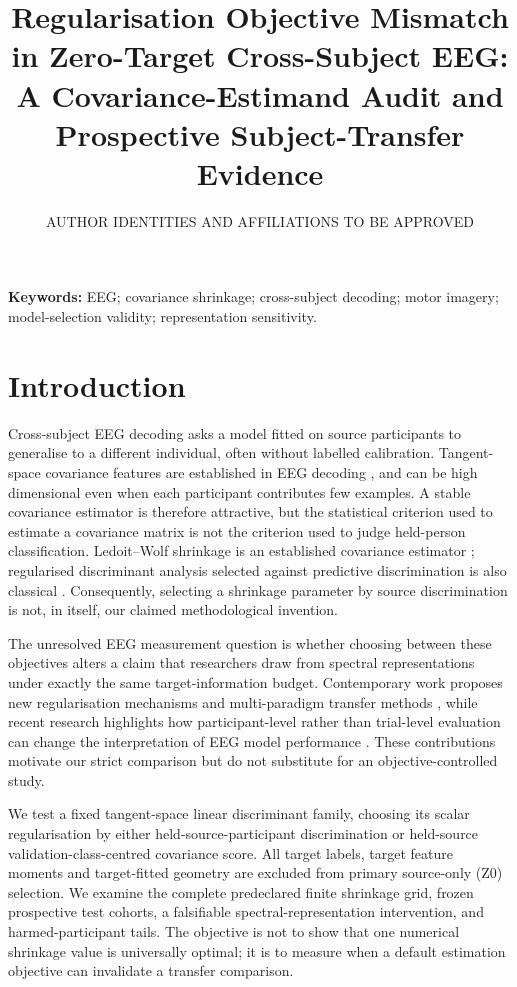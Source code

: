 \documentclass[11pt,a4paper]{article}
\title{Regularisation Objective Mismatch in Zero-Target Cross-Subject EEG:\\
A Covariance-Estimand Audit and Prospective Subject-Transfer Evidence}
\author{AUTHOR IDENTITIES AND AFFILIATIONS TO BE APPROVED}
\date{}
\begin{document}
\maketitle

\noindent\textbf{Keywords:} EEG; covariance shrinkage; cross-subject decoding;
motor imagery; model-selection validity; representation sensitivity.

\section{Introduction}
Cross-subject EEG decoding asks a model fitted on source participants to
generalise to a different individual, often without labelled calibration.
Tangent-space covariance features are established in EEG decoding
\cite{barachant2012riemannian}, and can be high dimensional even
when each participant contributes few examples. A stable covariance estimator is therefore
attractive, but the statistical criterion used to estimate a covariance
matrix is not the criterion used to judge held-person classification.
Ledoit--Wolf shrinkage is an established covariance estimator
\cite{ledoit2004}; regularised discriminant analysis selected against
predictive discrimination is also classical \cite{friedman1989}.
Consequently, selecting a shrinkage parameter by source discrimination
is not, in itself, our claimed methodological invention.

The unresolved EEG measurement question is whether choosing between these
objectives alters a claim that researchers draw from spectral representations
under exactly the same target-information budget. Contemporary work proposes
new regularisation mechanisms and multi-paradigm transfer methods
\cite{miao2025freezing,morvay2026wbt,he2026cyclic}, while recent research highlights
how participant-level rather than trial-level evaluation can change the
interpretation of EEG model performance \cite{gil2026subjectvalidation}.
These contributions motivate our strict comparison but do not substitute
for an objective-controlled study.

We test a fixed tangent-space linear discriminant family, choosing its
scalar regularisation by either held-source-participant discrimination or
held-source validation-class-centred covariance score. All target labels, target feature
moments and target-fitted geometry are excluded from primary source-only
(Z0) selection. We examine the complete predeclared finite shrinkage grid,
frozen prospective test cohorts, a falsifiable spectral-representation
intervention, and harmed-participant tails. The objective is not to show
that one numerical shrinkage value is universally optimal; it is to measure
when a default estimation objective can invalidate a transfer comparison.
\end{document}

